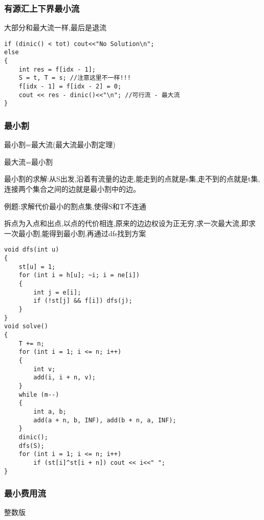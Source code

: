 \documentclass[a4paper,fontset=none]{ctexart}
\begin{document}
\subsubsection{有源汇上下界最小流}

大部分和最大流一样,最后是退流

\begin{verbatim}
if (dinic() < tot) cout<<"No Solution\n";
else
{
    int res = f[idx - 1];
    S = t, T = s; //注意这里不一样!!!
    f[idx - 1] = f[idx - 2] = 0;
    cout << res - dinic()<<"\n"; //可行流 - 最大流
}
\end{verbatim}
\subsubsection{最小割}

最小割=最大流(最大流最小割定理)

最大流=最小割

最小割的求解:从S出发,沿着有流量的边走,能走到的点就是s集,走不到的点就是t集,连接两个集合之间的边就是最小割中的边。

例题:求解代价最小的割点集,使得S和T不连通

拆点为入点和出点,以点的代价相连,原来的边边权设为正无穷,求一次最大流,即求一次最小割,能得到最小割,再通过dfs找到方案

\begin{verbatim}
void dfs(int u)
{
    st[u] = 1;
    for (int i = h[u]; ~i; i = ne[i])
    {
        int j = e[i];
        if (!st[j] && f[i]) dfs(j);
    }
}
void solve()
{
    T += n;
    for (int i = 1; i <= n; i++)
    {
        int v;
        add(i, i + n, v);
    }
    while (m--)
    {
        int a, b;
        add(a + n, b, INF), add(b + n, a, INF);
    }
    dinic();
    dfs(S);
    for (int i = 1; i <= n; i++)
        if (st[i]^st[i + n]) cout << i<<" ";
}
\end{verbatim}
\subsubsection{最小费用流}

整数版
\end{document}
